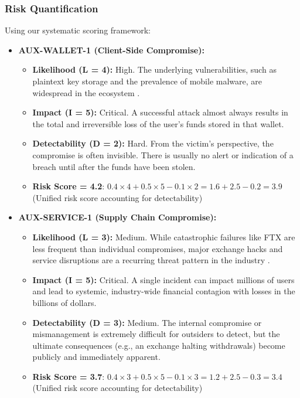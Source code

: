 \subsubsection{Risk Quantification}

Using our systematic scoring framework:

\begin{itemize}
    \item \textbf{AUX-WALLET-1 (Client-Side Compromise):}
    \begin{itemize}
        \item \textbf{Likelihood (L = 4):} High. The underlying vulnerabilities, such as plaintext key storage and the prevalence of mobile malware, are widespread in the ecosystem \cite{houy2023}.
        \item \textbf{Impact (I = 5):} Critical. A successful attack almost always results in the total and irreversible loss of the user's funds stored in that wallet.
        \item \textbf{Detectability (D = 2):} Hard. From the victim's perspective, the compromise is often invisible. There is usually no alert or indication of a breach until after the funds have been stolen.
        \item \textbf{Risk Score = 4.2}: $0.4 \times 4 + 0.5 \times 5 - 0.1 \times 2 = 1.6 + 2.5 - 0.2 = 3.9$ (Unified risk score accounting for detectability)
    \end{itemize}
    
    \item \textbf{AUX-SERVICE-1 (Supply Chain Compromise):}
    \begin{itemize}
        \item \textbf{Likelihood (L = 3):} Medium. While catastrophic failures like FTX are less frequent than individual compromises, major exchange hacks and service disruptions are a recurring threat pattern in the industry \cite{houy2023}.
        \item \textbf{Impact (I = 5):} Critical. A single incident can impact millions of users and lead to systemic, industry-wide financial contagion with losses in the billions of dollars.
        \item \textbf{Detectability (D = 3):} Medium. The internal compromise or mismanagement is extremely difficult for outsiders to detect, but the ultimate consequences (e.g., an exchange halting withdrawals) become publicly and immediately apparent.
        \item \textbf{Risk Score = 3.7}: $0.4 \times 3 + 0.5 \times 5 - 0.1 \times 3 = 1.2 + 2.5 - 0.3 = 3.4$ (Unified risk score accounting for detectability)
    \end{itemize}
\end{itemize}